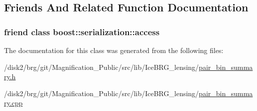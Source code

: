 \subsection{Friends And Related Function Documentation}
\hypertarget{classIceBRG_1_1pair__bin__summary_ac98d07dd8f7b70e16ccb9a01abf56b9c}{
\subsubsection[{boost\-::serialization\-::access}]{\setlength{\rightskip}{0pt plus 5cm}friend class boost\-::serialization\-::access\hspace{0.3cm}{\ttfamily [friend]}}}\label{classIceBRG_1_1pair__bin__summary_ac98d07dd8f7b70e16ccb9a01abf56b9c}


The documentation for this class was generated from the following files\-:\begin{DoxyCompactItemize}
\item 
/disk2/brg/git/\-Magnification\-\_\-\-Public/src/lib/\-Ice\-B\-R\-G\-\_\-lensing/\hyperlink{pair__bin__summary_8h}{pair\-\_\-bin\-\_\-summary.\-h}\item 
/disk2/brg/git/\-Magnification\-\_\-\-Public/src/lib/\-Ice\-B\-R\-G\-\_\-lensing/\hyperlink{pair__bin__summary_8cpp}{pair\-\_\-bin\-\_\-summary.\-cpp}\end{DoxyCompactItemize}
